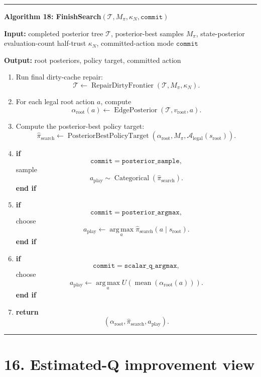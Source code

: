 \documentclass[11pt]{article}
\newcommand{\Cat}{\operatorname{Categorical}}
\newcommand{\argmax}{\operatorname*{arg\,max}}
\newcommand{\mean}{\operatorname{mean}}
\newcommand{\Tree}{\mathcal{T}}
\newcommand{\Legal}{\mathcal{A}_{\mathrm{legal}}}
\newcommand{\Utility}{U}
\newcommand{\EdgePosterior}{\operatorname{EdgePosterior}}
\newcommand{\PosteriorBestPolicyTarget}{\operatorname{PosteriorBestPolicyTarget}}
\newcommand{\RepairDirtyFrontier}{\operatorname{RepairDirtyFrontier}}
\newenvironment{algorithmblock}[1]
{
  \par\medskip
  \noindent\hrule\par\smallskip
  \noindent\textbf{#1}
  \par\smallskip
}
{
  \par\smallskip\noindent\hrule\par\medskip
}
\newcommand{\Input}{\textbf{Input: }}
\newcommand{\Output}{\textbf{Output: }}
\newcommand{\Return}{\textbf{return }}
\newcommand{\If}{\textbf{if }}
\newcommand{\EndIf}{\textbf{end if}}
\begin{document}
\begin{algorithmblock}{Algorithm 18: FinishSearch\((\Tree,M_\pi,\kappa_N,\texttt{commit})\)}

\Input completed posterior tree \(\Tree\), posterior-best samples \(M_\pi\), state-posterior evaluation-count half-trust \(\kappa_N\), committed-action mode \(\texttt{commit}\)

\Output root posteriors, policy target, committed action

\begin{enumerate}[leftmargin=2em]
  \item Run final dirty-cache repair:
  \[
  \Tree\gets\RepairDirtyFrontier(\Tree,M_\pi,\kappa_N).
  \]

  \item For each legal root action \(a\), compute
  \[
  \alpha_{\mathrm{root}}(a)
  \gets
  \EdgePosterior(\Tree,v_{\mathrm{root}},a).
  \]

  \item Compute the posterior-best policy target:
  \[
  \hat{\pi}_{\mathrm{search}}
  \gets
  \PosteriorBestPolicyTarget
  \left(
  \alpha_{\mathrm{root}},
  M_\pi,
  \Legal(s_{\mathrm{root}})
  \right).
  \]

  \item \If
  \[
  \texttt{commit}=\texttt{posterior\_sample},
  \]
  sample
  \[
  a_{\mathrm{play}}
  \sim
  \Cat
  \left(
  \hat{\pi}_{\mathrm{search}}
  \right).
  \]
  \EndIf

  \item \If
  \[
  \texttt{commit}=\texttt{posterior\_argmax},
  \]
  choose
  \[
  a_{\mathrm{play}}
  \gets
  \argmax_a
  \hat\pi_{\mathrm{search}}(a\mid s_{\mathrm{root}}).
  \]
  \EndIf

  \item \If
  \[
  \texttt{commit}=\texttt{scalar\_q\_argmax},
  \]
  choose
  \[
  a_{\mathrm{play}}
  \gets
  \argmax_a
  \Utility
  \left(
  \mean
  \left(
  \alpha_{\mathrm{root}}(a)
  \right)
  \right).
  \]
  \EndIf

  \item \Return
  \[
  \left(
  \alpha_{\mathrm{root}},
  \hat{\pi}_{\mathrm{search}},
  a_{\mathrm{play}}
  \right).
  \]
\end{enumerate}

\end{algorithmblock}

\section*{16. Estimated-Q improvement view}
\end{document}
